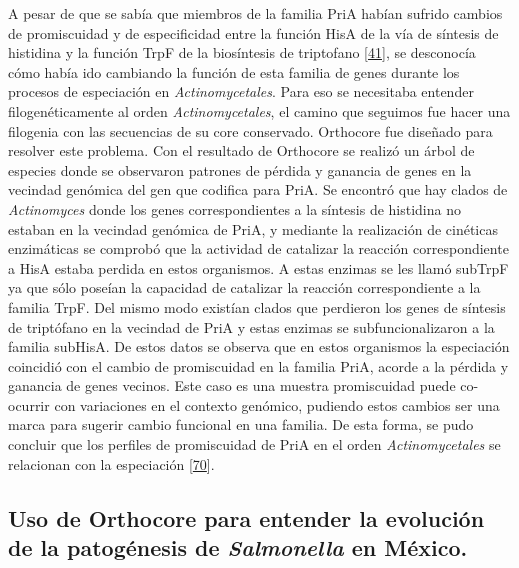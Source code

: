 \documentclass[12pt,twoside]{reedthesis}
\begin{document}
  A pesar de que se sabía que miembros de la familia PriA habían sufrido
  cambios de promiscuidad y de especificidad entre la función HisA de la
  vía de síntesis de histidina y la función TrpF de la biosíntesis de
  triptofano {[}\protect\hyperlink{ref-noda-garcia_evolution_2013}{41}{]},
  se desconocía cómo había ido cambiando la función de esta familia de
  genes durante los procesos de especiación en \emph{Actinomycetales}.
  Para eso se necesitaba entender filogenéticamente al orden
  \emph{Actinomycetales}, el camino que seguimos fue hacer una filogenia
  con las secuencias de su core conservado. Orthocore fue diseñado para
  resolver este problema. Con el resultado de Orthocore se realizó un
  árbol de especies donde se observaron patrones de pérdida y ganancia de
  genes en la vecindad genómica del gen que codifica para PriA. Se
  encontró que hay clados de \emph{Actinomyces} donde los genes
  correspondientes a la síntesis de histidina no estaban en la vecindad
  genómica de PriA, y mediante la realización de cinéticas enzimáticas se
  comprobó que la actividad de catalizar la reacción correspondiente a
  HisA estaba perdida en estos organismos. A estas enzimas se les llamó
  subTrpF ya que sólo poseían la capacidad de catalizar la reacción
  correspondiente a la familia TrpF. Del mismo modo existían clados que
  perdieron los genes de síntesis de triptófano en la vecindad de PriA y
  estas enzimas se subfuncionalizaron a la familia subHisA. De estos datos
  se observa que en estos organismos la especiación coincidió con el
  cambio de promiscuidad en la familia PriA, acorde a la pérdida y
  ganancia de genes vecinos. Este caso es una muestra promiscuidad puede
  co-ocurrir con variaciones en el contexto genómico, pudiendo estos
  cambios ser una marca para sugerir cambio funcional en una familia. De
  esta forma, se pudo concluir que los perfiles de promiscuidad de PriA en
  el orden \emph{Actinomycetales} se relacionan con la especiación
  {[}\protect\hyperlink{ref-juarez-vazquez_evolution_2017}{70}{]}.
  
  \subsection{\texorpdfstring{Uso de Orthocore para entender la evolución
  de la patogénesis de \emph{Salmonella} en
  México.}{Uso de Orthocore para entender la evolución de la patogénesis de Salmonella en México.}}\label{uso-de-orthocore-para-entender-la-evolucion-de-la-patogenesis-de-salmonella-en-mexico.}
  
\end{document}
